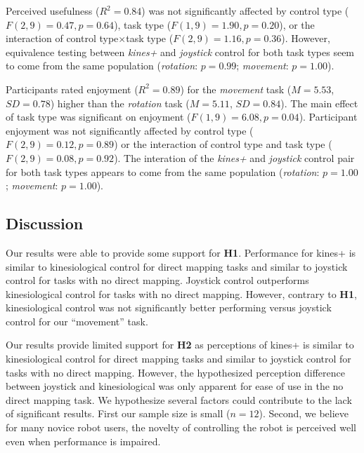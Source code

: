 \documentclass{sigchi}
\begin{document}
Perceived usefulness ($R^{2}=0.84$) was not significantly affected by control type ($F(2, 9)=0.47, p=0.64$), task type ($F(1, 9)=1.90, p=0.20$), or the interaction of control type$\times$task type  ($F(2, 9)=1.16, p=0.36$). 
However, equivalence testing between \textit{kines+} and \textit{joystick} control for both task types seem to come from the same population (\textit{rotation}: $p=0.99$; \textit{movement}: $p=1.00$).

Participants rated enjoyment ($R^{2}=0.89$) for the \textit{movement} task ($M=5.53$, $SD=0.78$) higher than the \textit{rotation} task ($M=5.11$, $SD=0.84$). The main effect of task type was significant on enjoyment ($F(1, 9)=6.08, p=0.04$). Participant enjoyment was not significantly affected by control type ($F(2, 9)=0.12, p=0.89$) or the interaction of control type and task type  ($F(2, 9)=0.08, p=0.92$). The interation of the \textit{kines+} and \textit{joystick} control pair for both task types appears to come from the same population (\textit{rotation}: $p=1.00$; \textit{movement}: $p=1.00$).

\subsection{Discussion}

Our results were able to provide some support for \textbf{H1}. Performance for kines+ is similar to kinesiological control for direct mapping tasks and similar to joystick control for tasks with no direct mapping. Joystick control outperforms kinesiological control for tasks with no direct mapping. However, contrary to \textbf{H1}, kinesiological control was not significantly better performing versus joystick control for our ``movement'' task.%

Our results provide limited support for \textbf{H2} as perceptions of kines+ is similar to kinesiological control for direct mapping tasks and similar to joystick control for tasks with no direct mapping. However, the hypothesized perception difference between joystick and kinesiological was only apparent for ease of use in the no direct mapping task. We hypothesize several factors could contribute to the lack of significant results. First our sample size is small ($n=12$). Second, we believe for many novice robot users, the novelty of controlling the robot is perceived well even when performance is impaired.
\end{document}
